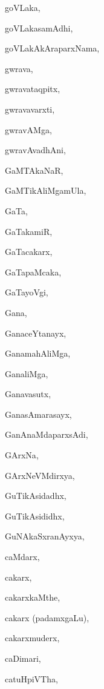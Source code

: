 \begin{multicols}{2}
{goVLaka}, \pageref{goVLaka}

{goVLakasamAdhi}, \pageref{goVLakasamAdhi}

{goVLakAkAraparxNama}, \pageref{goVLakAkAraparxNama}

{gwrava}, \pageref{gwrava}

{gwravataqpitx}, \pageref{gwravataqpitx}

{gwravavarxti}, \pageref{gwravavarxti}

{gwravAMga}, \pageref{gwravAMga}

{gwravAvadhAni}, \pageref{gwravAvadhAni}

{GaMTAkaNaR}, \pageref{GaMTAkaNaR}

{GaMTikAliMgamUla}, \pageref{GaMTikAliMgamUla}

{GaTa}, \pageref{GaTa}

{GaTakamiR}, \pageref{GaTakamiR}

{GaTacakarx}, \pageref{GaTacakarx}

{GaTapaMcaka}, \pageref{GaTapaMcaka}

{GaTayoVgi}, \pageref{GaTayoVgi}

{Gana}, \pageref{Gana}

{GanaceYtanayx}, \pageref{GanaceYtanayx}

{GanamahAliMga}, \pageref{GanamahAliMga}

{GanaliMga}, \pageref{GanaliMga}

{Ganavasutx}, \pageref{Ganavasutx}

{GanasAmarasayx}, \pageref{GanasAmarasayx}

{GanAnaMdaparxsAdi}, \pageref{GanAnaMdaparxsAdi}

{GArxNa}, \pageref{GArxNa}

{GArxNeVMdirxya}, \pageref{GArxNeVMdirxya}

{GuTikAsidadhx}, \pageref{GuTikAsidadhx}

{GuTikAsididhx}, \pageref{GuTikAsididhx}

{GuNAkaSxranAyxya}, \pageref{GuNAkaSxranAyxya}

{caMdarx}, \pageref{caMdarx}

{cakarx}, \pageref{cakarx}

{cakarxkaMthe}, \pageref{cakarxkaMthe}

{cakarx (padamxgaLu)}, \pageref{cakarx (padamxgaLu)}

{cakarxmuderx}, \pageref{cakarxmuderx}

{caDimari}, \pageref{caDimari}

{catuHpiVTha}, \pageref{catuHpiVTha}


\end{multicols}
